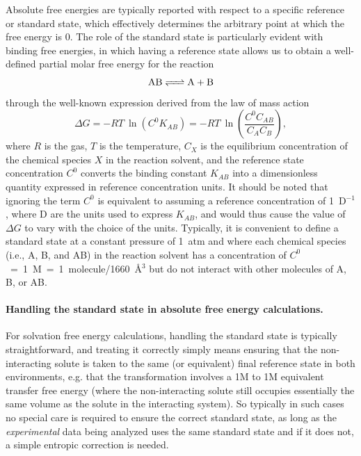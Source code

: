 \documentclass[9pt,bestpractices]{livecoms}
\begin{document}
Absolute free energies are typically reported with respect to a specific reference or standard state, which effectively determines the arbitrary point at which the free energy is 0.
The role of the standard state is particularly evident with binding free energies, in which having a reference state allows us to obtain a well-defined partial molar free energy for the reaction
\begin{equation*}
\ce{AB <=> A + B}
\end{equation*}
through the well-known expression derived from the law of mass action
\begin{equation} \label{eq:DGfromKAB}
\Delta G = -RT ~ \ln \left( C^0 K_{AB} \right)  = -RT ~ \ln\left( \frac{C^0 C_{AB}}{C_A C_B} \right) ,
\end{equation}
where $R$ is the gas, $T$ is the temperature, $C_X$ is the equilibrium concentration of the chemical species $X$ in the reaction solvent, and the reference state concentration $C^0$ converts the binding constant $K_{AB}$ into a dimensionless quantity expressed in reference concentration units.
It should be noted that ignoring the term $C^0$ is equivalent to assuming a reference concentration of 1~D$^{-1}$, where D are the units used to express $K_{AB}$, and would thus cause the value of $\Delta G$ to vary with the choice of the units.
Typically, it is convenient to define a standard state at a constant pressure of 1~atm and where each chemical species (i.e., A, B, and AB) in the reaction solvent has a concentration of $C^0$~=~1~M~=~1~molecule/1660~\r{A}$^3$ but do not interact with other molecules of A, B, or AB.

\paragraph{Handling the standard state in absolute free energy calculations.}

For solvation free energy calculations, handling the standard state is typically straightforward, and treating it correctly simply means ensuring that the non-interacting solute is taken to the same (or equivalent) final reference state in both environments, e.g. that the transformation involves a 1M to 1M equivalent transfer free energy (where the non-interacting solute still occupies essentially the same volume as the solute in the interacting system).
So typically in such cases no special care is required to ensure the correct standard state, as long as the \emph{experimental} data being analyzed uses the same standard state and if it does not, a simple entropic correction is needed.
\end{document}
